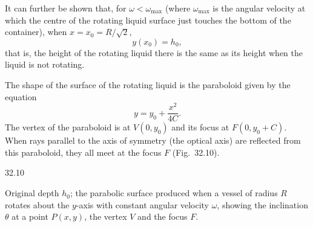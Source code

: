 It can further be shown that, for $\omega<\omega_{\max}$ (where $\omega_{\max}$ is the angular velocity at which the centre of the rotating liquid surface just touches the bottom of the container), when $x=x_0=R/\sqrt{2}$,
\begin{equation}
y(x_0)=h_0, \tag{2}
\end{equation}
that is, the height of the rotating liquid there is the same as its height when the liquid is not rotating.

The shape of the surface of the rotating liquid is the paraboloid given by the equation
\begin{equation}
y=y_0+\frac{x^2}{4C}. \tag{3}
\end{equation}
The vertex of the paraboloid is at $V(0,y_0)$ and its focus at $F(0,y_0+C)$. When rays parallel to the axis of symmetry (the optical axis) are reflected from this paraboloid, they all meet at the focus $F$ (Fig.~32.10).

\begin{figbox}{32.10}

\smallskip
{\footnotesize Original depth $h_0$; the parabolic surface produced when a vessel of radius $R$ rotates about the $y$-axis with constant angular velocity $\omega$, showing the inclination $\theta$ at a point $P(x,y)$, the vertex $V$ and the focus $F$.}
\end{figbox}

